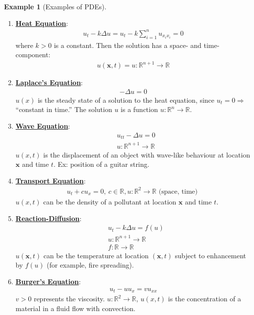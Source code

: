 \documentclass[11pt]{scrartcl}
\newcommand{\R}[0]{\mathbb{R}}
\theoremstyle{definition}
\newtheorem{ex}{Example}
\theoremstyle{remark}
\newcommand{\dfn}[1]{\textbf{\underline{#1}}}
\newcommand{\vect}[1]{\mathbf{#1}}
\begin{document}
\begin{ex}[Examples of PDEs] 
	\begin{enumerate}[noitemsep]
		\item \dfn{Heat Equation}: 
		\begin{align}
				u_t - k \Delta u = u_t - k \sum_{i=1}^n u_{x_i x_i} = 0 
		\end{align}
		where $k > 0$ is a constant. Then the solution has a space- and time- component: 
		\begin{align}
			u(\vect{x}, t) = u: \R^{n+1} \rightarrow \R 
		\end{align}
	\item \dfn{Laplace's Equation}: 
	\begin{align}
			- \Delta u = 0 
	\end{align}
	$u(x)$ is the steady state of a solution to the heat equation, since $u_t = 0 \Rightarrow$ ``constant in time.'' The solution $u$ is a function $u: \R^n \rightarrow \R$. 
	\item \dfn{Wave Equation}: 
	\begin{align*}
		& u_{tt} - \Delta u = 0 \\
		& u: \R^{n+1} \rightarrow \R 
	\end{align*}
	$u(x,t)$ is the displacement of an object with wave-like behaviour at location $\vect{x}$ and time $t$. Ex: position of a guitar string. 
	\item \dfn{Transport Equation}: 
	\begin{align*} 
		u_t + cu_x = 0,\ c \in \R, u: \R^2 \rightarrow \R \text{ (space, time) } 
	\end{align*} 
	$u(x,t)$ can be the density of a pollutant at location $\vect{x}$ and time $t$. 
	\item  \dfn{Reaction-Diffusion}: 
	\begin{align*}
		& u_t - k \Delta u = f(u) \\
		& u: \R^{n+1} \rightarrow \R \\
		& f: \R \rightarrow \R 	
	\end{align*}
	$u( \vect{x},t)$ can be the temperature at location $(\vect{x}, t)$ subject to enhancement by $f(u)$ (for example, fire spreading). 
	\item \dfn{Burger's Equation}: 
	\begin{align}
		u_t - u u_x = vu_{xx} 
	\end{align}
	$v > 0$ represents the viscosity. $u: \R^2 \rightarrow \R$, $u(x,t)$ is the concentration of a material in a fluid flow with convection. 
	\end{enumerate}	
\end{ex}
\end{document}
